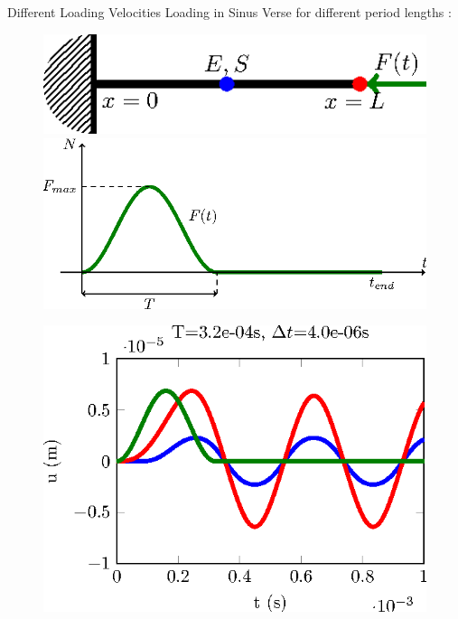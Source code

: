 \documentclass[12pt]{beamer}
\begin{document}
\begin{frame}{Different Loading Velocities} 
	Loading in Sinus Verse for different period lengths :
	
	\begin{figure}
		\begin{minipage}[b]{0.4\linewidth}
			\includegraphics[width=1\linewidth]{Beam-tikz.eps}
		\end{minipage}
		 \hspace{1cm}
		\begin{minipage}[b]{0.4\linewidth}
			\includegraphics[width=1\linewidth]{SinVerse-tikz.eps}
		\end{minipage}
	\end{figure}
	\begin{figure}
		\begin{minipage}{0.24\linewidth}
			\includegraphics[width=1\linewidth]{CalculSchem3-T4-tikz.eps}

\end{minipage}
\end{figure}
\end{frame}
\end{document}

